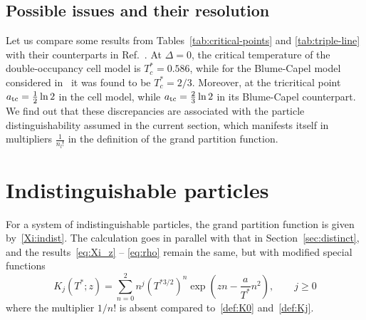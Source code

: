 \documentclass[pdflatex,sn-mathphys-num]{sn-jnl}%
\theoremstyle{thmstyleone}%
\theoremstyle{thmstyletwo}%
\theoremstyle{thmstylethree}%
\begin{document}
	
	\subsection{Possible issues and their resolution}
	Let us compare some results from Tables~\ref{tab:critical-points} and \ref{tab:triple-line} with their counterparts in Ref.~\cite{HKBHK25}. At $\Delta = 0$, the critical temperature of the double-occupancy cell model is $T^*_c=0.586$, while for the Blume-Capel model considered in~\cite{HKBHK25} it was found to be $T^*_c=2/3$. Moreover, at the tricritical point $a_{\rm tc}=\frac{1}{2}\ln 2$ in the cell model, while $a_{\rm tc}=\frac{2}{3} \ln 2$ in its Blume-Capel counterpart. We find out that these discrepancies are associated with the particle  distinguishability assumed in the current section, which manifests itself in  multipliers $\frac{1}{n_l!}$ in the definition of the grand partition function.
	
	\section{Indistinguishable particles} \label{sec:indist}
	For a system of indistinguishable particles, the grand partition function is given by~\eqref{Xi:indist}. The calculation goes in parallel with that in Section~\ref{sec:distinct}, and the results~\eqref{eq:Xi_z} -- \eqref{eq:rho} remain the same, but with modified special functions
		\begin{equation}\label{def:K0ind}
			K_j(T^*; z) = \sum_{n=0}^2 n^j \left(T^{*3/2}\right)^n \exp\left(z n - \frac{a}{T^*}n^2\right),\qquad j\ge0
		\end{equation}
	where the multiplier $1/n!$ is absent compared to~\eqref{def:K0} and~\eqref{def:Kj}.
	
\end{document}
